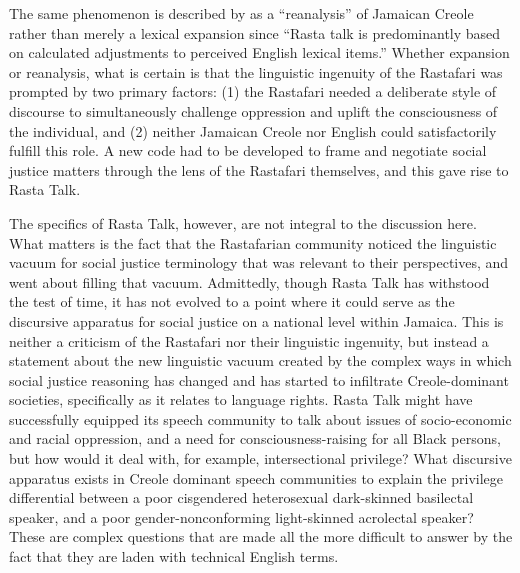 \documentclass[output=paper,colorlinks,citecolor=brown]{langscibook}
\begin{document}
The same phenomenon is described by \citet{Schrenk2015} as a “reanalysis” of Jamaican Creole rather than merely a lexical expansion since “Rasta talk is predominantly based on calculated adjustments to perceived English lexical items.” Whether expansion or reanalysis, what is certain is that the linguistic ingenuity of the Rastafari was prompted by two primary factors: (1) the Rastafari needed a deliberate style of discourse to simultaneously challenge oppression and uplift the consciousness of the individual, and (2) neither Jamaican Creole nor English could satisfactorily fulfill this role. A new code had to be developed to frame and negotiate social justice matters through the lens of the Rastafari themselves, and this gave rise to Rasta Talk. 

The specifics of Rasta Talk, however, are not integral to the discussion here. What matters is the fact that the Rastafarian community noticed the linguistic vacuum for social justice terminology that was relevant to their perspectives, and went about filling that vacuum. Admittedly, though Rasta Talk has withstood the test of time, it has not evolved to a point where  it could serve as the discursive apparatus for social justice on a national level within Jamaica. This is neither a criticism of the Rastafari nor their linguistic ingenuity, but instead a statement about the new linguistic vacuum created by the complex ways in which social justice reasoning has changed and has started to infiltrate Creole-dominant societies, specifically as it relates to language rights. Rasta Talk might have successfully equipped its speech community to talk about issues of socio-economic and racial oppression, and a need for consciousness-raising for all Black persons, but how would it deal with, for example, intersectional privilege? What discursive apparatus exists in Creole dominant speech communities to explain the privilege differential between a poor cisgendered heterosexual dark-skinned basilectal speaker, and a poor gender-nonconforming light-skinned acrolectal speaker? These are complex questions that are made all the more difficult to answer by the fact that they are laden with technical English terms.
\end{document}
